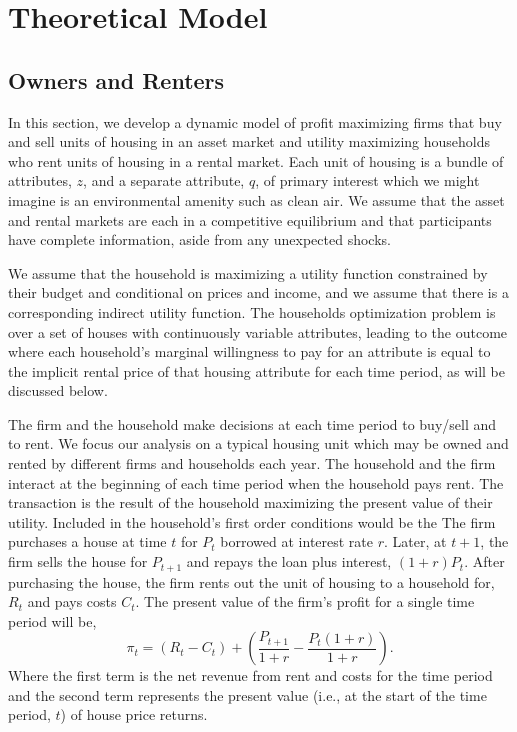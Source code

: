 \documentclass[ecta,nameyear,draft]{econsocart}
\theoremstyle{plain}
\theoremstyle{remark}
\begin{document}
\section{Theoretical Model}
\subsection{Owners and Renters}
In this section, we develop a dynamic model of profit maximizing firms that buy and sell units of housing in an asset market and utility maximizing households who rent units of housing in a rental market. Each unit of housing is a bundle of attributes, $z$, and a separate attribute, $q$, of primary interest which we might imagine is an environmental amenity such as clean air. We assume that the asset and rental markets are each in a competitive equilibrium and that participants have complete information, aside from any unexpected shocks.

We assume that the household is maximizing a utility function constrained by their budget and conditional on prices and income, and we assume that there is a corresponding indirect utility function. The households optimization problem is over a set of houses with continuously variable attributes, leading to the outcome where each household's marginal willingness to pay for an attribute is equal to the implicit rental price of that housing attribute for each time period, as will be discussed below.

The firm and the household make decisions at each time period to buy/sell and to rent. We focus our analysis on a typical housing unit which may be owned and rented by different firms and households each year. 
The household and the firm interact at the beginning of each time period when the household pays rent. The transaction is the result of the household maximizing the present value of their utility. Included in the household's first order conditions would be the  
The firm purchases a house at time $t$ for $P_t$ borrowed at interest rate $r$. Later, at $t+1$, the firm sells the house for $P_{t+1}$ and repays the loan plus interest, $(1 + r)P_t$. After purchasing the house, the firm rents
out the unit of housing to a household for, $R_t$ and pays costs $C_t$. The present value of the firm’s profit for a single time period will be,
\begin{equation}
	\pi_t = (R_t-C_t)+\left(\frac{P_{t+1}}{1+r}-\frac{P_t(1+r)}{1+r}\right).\label{pi1}
\end{equation}
Where the first term is the net revenue from rent and costs for the time period and the second term
represents the present value (i.e., at the start of the time period, $t$) of house price returns.
\end{document}
